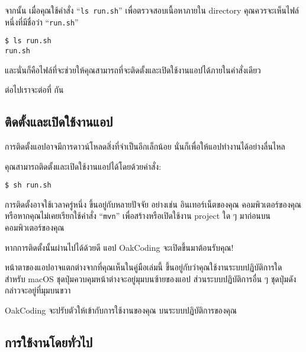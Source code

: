 \clearpage

จากนั้น เมื่อคุณใช้คำสั่ง ``\texttt{ls run.sh}'' เพื่อตรวจสอบเนื้อหาภายใน directory คุณควรจะเห็นไฟล์หนึ่งที่มีชื่อว่า ``\texttt{run.sh}''

\begin{lstlisting}[numbers=none]
$ ls run.sh
run.sh
\end{lstlisting}

และนั่นก็คือไฟล์ที่จะช่วยให้คุณสามารถที่จะติดตั้งและเปิดใช้งานแอปได้ภายในคำสั่งเดียว

ต่อไปเราจะต่อที่  กัน

\clearpage

\subsection{ติดตั้งและเปิดใช้งานแอป}
\label{subsec:launch-app}

\rule{0em}{1ex}

การติดตั้งแอปอาจมีการดาวน์โหลดสิ่งที่จำเป็นอีกเล็กน้อย
นั่นก็เพื่อให้แอปทำงานได้อย่างลื่นไหล

คุณสามารถติดตั้งและเปิดใช้งานแอปได้โดยด้วยคำสั่ง:

\begin{lstlisting}[numbers=none]
$ sh run.sh
\end{lstlisting}

การติดตั้งอาจใช้เวลาครู่หนึ่ง ขึ้นอยู่กับหลายปัจจัย อย่างเช่น อินเทอร์เน็ตของคุณ
คอมพิวเตอร์ของคุณ หรือหากคุณไม่เคยเรียกใช้คำสั่ง ``\texttt{mvn}'' เพื่อสร้างหรือเปิดใช้งาน
project ใด ๆ มาก่อนบนคอมพิวเตอร์ของคุณ

หากการติดตั้งนั้นผ่านไปได้ด้วยดี แอป OakCoding จะเปิดขึ้นมาต้อนรับคุณ!


หน้าตาของแอปอาจแตกต่างจากที่คุณเห็นในคู่มือเล่มนี้
ขึ้นอยู่กับว่าคุณใช้งานระบบปฏิบัติการใด สำหรับ macOS ชุดปุ่มควบคุมหน้าต่างจะอยู่มุมบนซ้ายของแอป
ส่วนระบบปฏิบัติการอื่น ๆ ชุดปุ่มดังกล่าวจะอยู่ที่มุมบนขวา

OakCoding จะปรับตัวให้เข้ากับการใช้งานของคุณ บนระบบปฏิบัติการของคุณ

\clearpage

\subsection{การใช้งานโดยทั่วไป}


